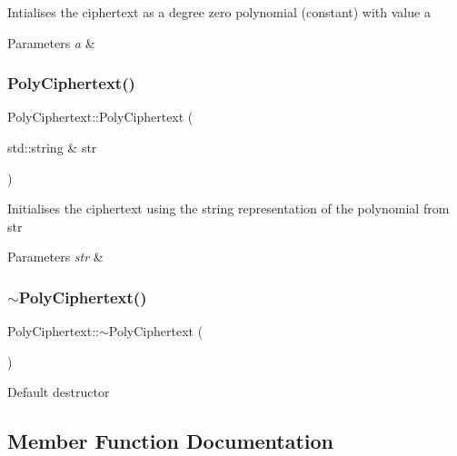 Intialises the ciphertext as a degree zero polynomial (constant) with value {\ttfamily a} 
\begin{DoxyParams}{Parameters}
{\em a} & \\
\hline
\end{DoxyParams}
\mbox{\label{classPolyCiphertext_ad46cd9f5dfa2313798e5302f7d7a9445}} 
\subsubsection{\texorpdfstring{Poly\+Ciphertext()}{PolyCiphertext()}\hspace{0.1cm}{\footnotesize\ttfamily [4/4]}}
{\footnotesize\ttfamily Poly\+Ciphertext\+::\+Poly\+Ciphertext (\begin{DoxyParamCaption}\item[{std\+::string \&}]{str }\end{DoxyParamCaption})}

Initialises the ciphertext using the string representation of the polynomial from {\ttfamily str} 
\begin{DoxyParams}{Parameters}
{\em str} & \\
\hline
\end{DoxyParams}
\mbox{\label{classPolyCiphertext_aeee18e28294a2cac4e95fcc704026673}} 
\subsubsection{\texorpdfstring{$\sim$\+Poly\+Ciphertext()}{~PolyCiphertext()}}
{\footnotesize\ttfamily Poly\+Ciphertext\+::$\sim$\+Poly\+Ciphertext (\begin{DoxyParamCaption}{ }\end{DoxyParamCaption})\hspace{0.3cm}{\ttfamily [virtual]}}

Default destructor 

\subsection{Member Function Documentation}
\mbox{\label{classPolyCiphertext_a6405ebc8f6ad048239ea6f8d677702af}} 
